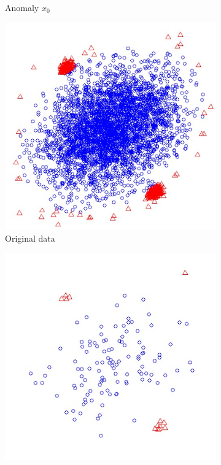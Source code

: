 \begin{figure}
\begin{subfigure}[t]{0.23\textwidth}
        \caption{Anomaly $x_0$}
        \label{fig:IF_isolate_abnormal_inst}
    \end{subfigure}
    \begin{subfigure}[t]{0.23\textwidth}
        \includegraphics[width=1\textwidth]{images/IF_original_sample.jpg}
        \caption{Original data}   
        \label{fig:IF_original_sample}
    \end{subfigure}
    \begin{subfigure}[t]{0.23\textwidth}
        \includegraphics[width=1\textwidth]{images/IF_subsample.jpg}

\end{subfigure}
\end{figure}
